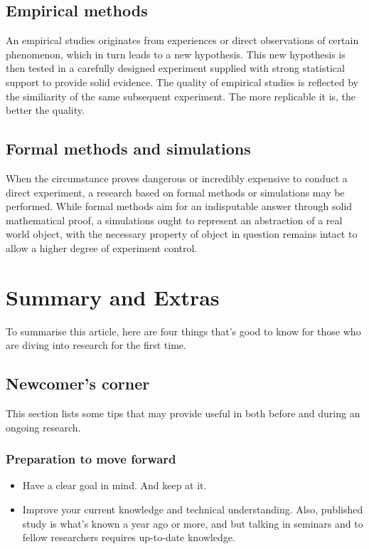 \documentclass[a4paper,12pt]{article}
\begin{document}
        \subsection{Empirical methods}
            An empirical studies originates from experiences or direct observations of certain phenomenon, which in turn leads to a new hypothesis. This new hypothesis is then tested in a carefully designed experiment supplied with strong statistical support to provide solid evidence. The quality of empirical studies is reflected by the similiarity of the same subsequent experiment. The more replicable it is, the better the quality.

        \subsection{Formal methods and simulations}
            When the circumstance proves dangerous or incredibly expensive to conduct a direct experiment, a research based on formal methods or simulations may be performed. While formal methods aim for an indisputable answer through solid mathematical proof, a simulations ought to represent an abstraction of a real world object, with the necessary property of object in question remains intact to allow a higher degree of experiment control.

    \section{Summary and Extras}
        To summarise this article, here are four things that's good to know for those who are diving into research for the first time\cite{Shapiro15}.

        \subsection{Newcomer's corner}
            This section lists some tips that may provide useful in both before and during an ongoing research.

            \subsubsection{Preparation to move forward}
                \begin{itemize}
                    \item Have a clear goal in mind. And keep at it.
                    \item Improve your current knowledge and technical understanding.
                    Also, published study is what's known a year ago or more, and but talking in seminars and to fellow researchers requires up-to-date knowledge.
                \end{itemize}
\end{document}
